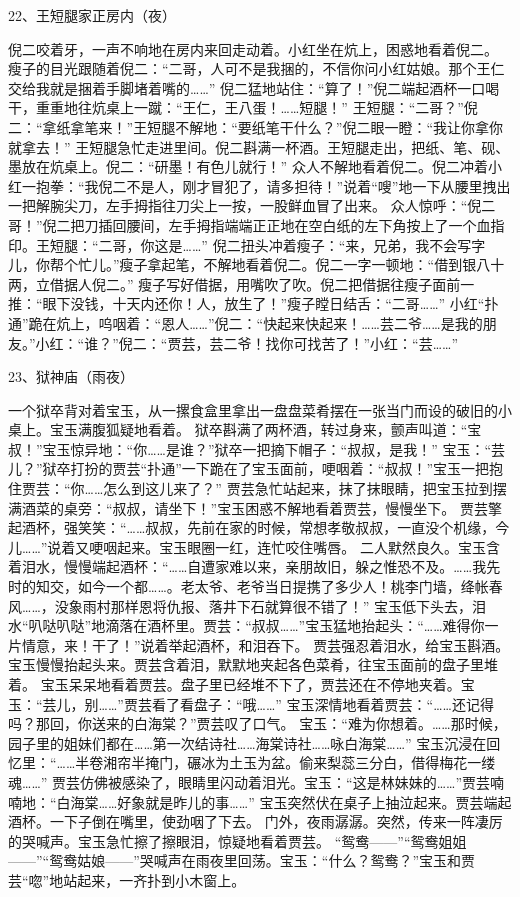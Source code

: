 22、王短腿家正房内（夜）\par
倪二咬着牙，一声不响地在房内来回走动着。小红坐在炕上，困惑地看着倪二。
瘦子的目光跟随着倪二：“二哥，人可不是我捆的，不信你问小红姑娘。那个王仁交给我就是捆着手脚堵着嘴的……”
倪二猛地站住：“算了！”倪二端起酒杯一口喝干，重重地往炕桌上一蹴：“王仁，王八蛋！……短腿！”
王短腿：“二哥？”倪二：“拿纸拿笔来！”王短腿不解地：“要纸笔干什么？”倪二眼一瞪：“我让你拿你就拿去！”
王短腿急忙走进里间。倪二斟满一杯酒。王短腿走出，把纸、笔、砚、墨放在炕桌上。倪二：“研墨！有色儿就行！”
众人不解地看着倪二。倪二冲着小红一抱拳：“我倪二不是人，刚才冒犯了，请多担待！”说着“嗖”地一下从腰里拽出一把解腕尖刀，左手拇指往刀尖上一按，一股鲜血冒了出来。
众人惊呼：“倪二哥！”倪二把刀插回腰间，左手拇指端端正正地在空白纸的左下角按上了一个血指印。王短腿：“二哥，你这是……”
倪二扭头冲着瘦子：“来，兄弟，我不会写字儿，你帮个忙儿。”瘦子拿起笔，不解地看着倪二。倪二一字一顿地：“借到银八十两，立借据人倪二。”
瘦子写好借据，用嘴吹了吹。倪二把借据往瘦子面前一推：“眼下没钱，十天内还你！人，放生了！”瘦子瞠日结舌：“二哥……”
小红“扑通”跪在炕上，呜咽着：“恩人……”倪二：“快起来快起来！……芸二爷……是我的朋友。”小红：“谁？”倪二：“贾芸，芸二爷！找你可找苦了！”小红：“芸……”

23、狱神庙（雨夜）\par
一个狱卒背对着宝玉，从一摞食盒里拿出一盘盘菜肴摆在一张当门而设的破旧的小桌上。宝玉满腹狐疑地看着。
狱卒斟满了两杯酒，转过身来，颤声叫道：“宝叔！”宝玉惊异地：“你……是谁？”狱卒一把摘下帽子：“叔叔，是我！”
宝玉：“芸儿？”狱卒打扮的贾芸“扑通”一下跪在了宝玉面前，哽咽着：“叔叔！”宝玉一把抱住贾芸：“你……怎么到这儿来了？”
贾芸急忙站起来，抹了抹眼睛，把宝玉拉到摆满酒菜的桌旁：“叔叔，请坐下！”宝玉困惑不解地看着贾芸，慢慢坐下。
贾芸擎起酒杯，强笑笑：“……叔叔，先前在家的时候，常想孝敬叔叔，一直没个机缘，今儿……”说着又哽咽起来。宝玉眼圈一红，连忙咬住嘴唇。
二人默然良久。宝玉含着泪水，慢慢端起酒杯：“……自遭家难以来，亲朋故旧，躲之惟恐不及。……我先时的知交，如今一个都……。老太爷、老爷当日提携了多少人！桃李门墙，绛帐春风……，没象雨村那样恩将仇报、落井下石就算很不错了！”
宝玉低下头去，泪水“叭哒叭哒”地滴落在酒杯里。贾芸：“叔叔……”宝玉猛地抬起头：“……难得你一片情意，来！干了！”说着举起酒杯，和泪吞下。
贾芸强忍着泪水，给宝玉斟酒。宝玉慢慢抬起头来。贾芸含着泪，默默地夹起各色菜肴，往宝玉面前的盘子里堆着。
宝玉呆呆地看着贾芸。盘子里已经堆不下了，贾芸还在不停地夹着。宝玉：“芸儿，别……”贾芸看了看盘子：“哦……”
宝玉深情地看着贾芸：“……还记得吗？那回，你送来的白海棠？”贾芸叹了口气。
宝玉：“难为你想着。……那时候，园子里的姐妹们都在……第一次结诗社……海棠诗社……咏白海棠……”
宝玉沉浸在回忆里：“……半卷湘帘半掩门，碾冰为土玉为盆。偷来梨蕊三分白，借得梅花一缕魂……”
贾芸仿佛被感染了，眼睛里闪动着泪光。宝玉：“这是林妹妹的……”贾芸喃喃地：“白海棠……好象就是昨儿的事……”
宝玉突然伏在桌子上抽泣起来。贾芸端起酒杯。一下子倒在嘴里，使劲咽了下去。
门外，夜雨潺潺。突然，传来一阵凄厉的哭喊声。宝玉急忙擦了擦眼泪，惊疑地看着贾芸。
“鸳鸯——”“鸳鸯姐姐——”“鸳鸯姑娘——”哭喊声在雨夜里回荡。宝玉：“什么？鸳鸯？”宝玉和贾芸“唿”地站起来，一齐扑到小木窗上。


